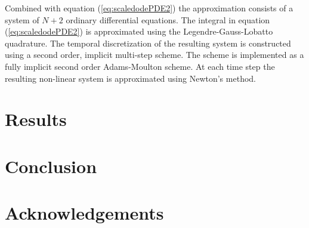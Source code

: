 \documentclass[12pt]{article}
\begin{document}
Combined with equation (\ref{eq:scaledodePDE2}) the approximation
consists of a system of $N+2$ ordinary differential equations. The
integral in equation (\ref{eq:scaledodePDE2}) is approximated using
the Legendre-Gauss-Lobatto quadrature. The temporal discretization of
the resulting system is constructed using a second order, implicit
multi-step scheme. The scheme is implemented as a fully implicit
second order Adams-Moulton scheme\cite{ascher2011first}. At each time
step the resulting non-linear system is approximated using Newton's
method.

\section{Results}
\label{section:results}

\section{Conclusion}

\section{Acknowledgements}



\end{document}
